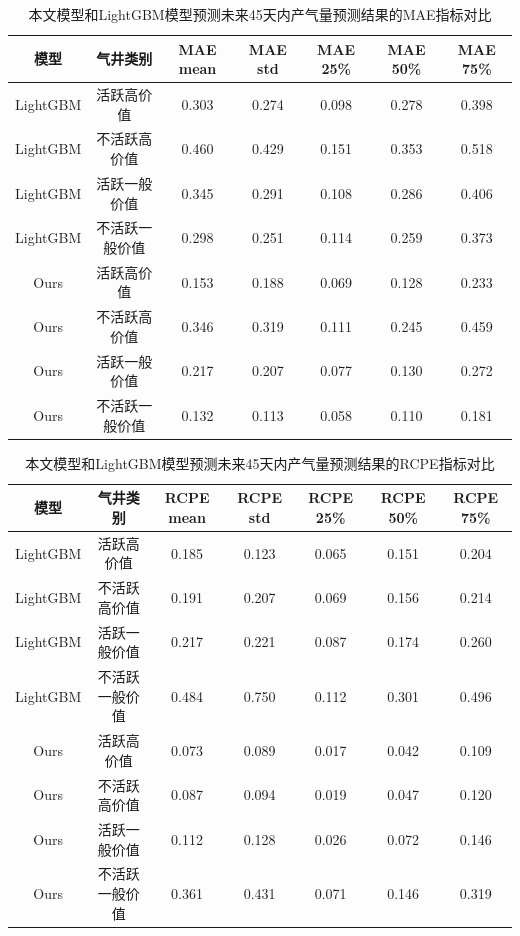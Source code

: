 \begin{table}[H]
    \renewcommand{\arraystretch}{1.5}
    \centering
    \caption{本文模型和LightGBM模型预测未来45天内产气量预测结果的MAE指标对比}
    \label{tab:MAE45}
    \begin{tabular}{|c|c|c|c|c|c|c|}
    \hline
    模型       & 气井类别 & MAE mean & MAE std & MAE 25\% & MAE 50\% & MAE 75\% \\ \hline
    LightGBM  & 活跃高价值        & 0.303   & 0.274    &0.098    & 0.278     & 0.398 \\ \hline
    LightGBM  & 不活跃高价值      & 0.460    & 0.429   & 0.151    & 0.353    & 0.518    \\ \hline
    LightGBM  & 活跃一般价值     & 0.345    & 0.291   & 0.108    & 0.286    & 0.406    \\ \hline
    LightGBM  & 不活跃一般价值      & 0.298    & 0.251   & 0.114    & 0.259    & 0.373    \\ \hline
    Ours       & 活跃高价值        &0.153     & 0.188   & 0.069     & 0.128   & 0.233   \\ \hline
    Ours       & 不活跃高价值      & 0.346    & 0.319   & 0.111    & 0.245    & 0.459    \\ \hline
    Ours       & 活跃一般价值     & 0.217    & 0.207   & 0.077    & 0.130    & 0.272    \\ \hline
    Ours       & 不活跃一般价值      & 0.132    & 0.113   & 0.058    & 0.110    & 0.181    \\ \hline
    \end{tabular}
\end{table} 
\begin{table}[H]
    \renewcommand{\arraystretch}{1.5}
    \centering
    \caption{本文模型和LightGBM模型预测未来45天内产气量预测结果的RCPE指标对比}
    \label{tab:RCPE45}
    \begin{tabular}{|c|c|c|c|c|c|c|}
    \hline
    模型       & 气井类别 & RCPE mean & RCPE std & RCPE 25\% & RCPE 50\% & RCPE 75\% \\ \hline
    LightGBM  & 活跃高价值       & 0.185      &0.123    &0.065      &0.151      & 0.204 \\ \hline
    LightGBM  & 不活跃高价值      & 0.191     & 0.207    & 0.069     & 0.156     & 0.214     \\ \hline
    LightGBM  & 活跃一般价值     & 0.217     & 0.221    & 0.087     & 0.174     & 0.260     \\ \hline
    LightGBM  & 不活跃一般价值      & 0.484     & 0.750    & 0.112     & 0.301     & 0.496     \\ \hline
    Ours       &活跃高价值          & 0.073    &0.089      & 0.017     & 0.042     & 0.109 \\ \hline
    Ours       & 不活跃高价值      & 0.087     & 0.094    & 0.019     & 0.047     & 0.120     \\ \hline
    Ours       & 活跃一般价值     & 0.112     & 0.128    & 0.026     & 0.072     & 0.146     \\ \hline
    Ours       & 不活跃一般价值      & 0.361     & 0.431    & 0.071     & 0.146     & 0.319     \\ \hline
    \end{tabular}
\end{table}
